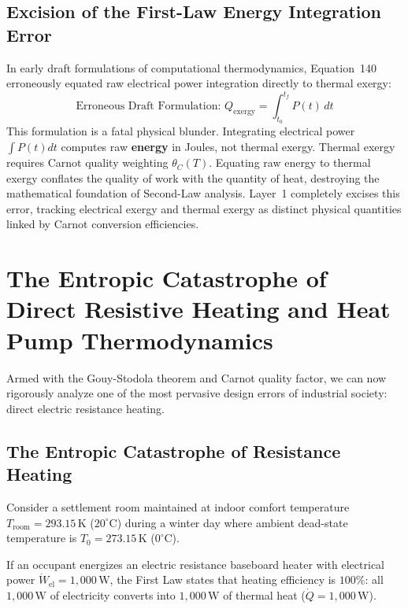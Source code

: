 \subsection{Excision of the First-Law Energy Integration Error}
In early draft formulations of computational thermodynamics, Equation~140 erroneously equated raw electrical power integration directly to thermal exergy:
\begin{equation}
\text{Erroneous Draft Formulation: } Q_{\mathrm{exergy}} = \int_{t_0}^{t_f} P(t) \, dt
\label{eq:erroneous_draft_eq}
\end{equation}
This formulation is a fatal physical blunder. Integrating electrical power $\int P(t) dt$ computes raw \textbf{energy} in Joules, not thermal exergy. Thermal exergy requires Carnot quality weighting $\theta_C(T)$. Equating raw energy to thermal exergy conflates the quality of work with the quantity of heat, destroying the mathematical foundation of Second-Law analysis. Layer~1 completely excises this error, tracking electrical exergy and thermal exergy as distinct physical quantities linked by Carnot conversion efficiencies.

\section{The Entropic Catastrophe of Direct Resistive Heating and Heat Pump Thermodynamics}
\label{sec:th_resistive_heatpump}

Armed with the Gouy-Stodola theorem and Carnot quality factor, we can now rigorously analyze one of the most pervasive design errors of industrial society: direct electric resistance heating.

\subsection{The Entropic Catastrophe of Resistance Heating}
Consider a settlement room maintained at indoor comfort temperature $T_{\mathrm{room}} = 293.15\,\mathrm{K}$ ($20^\circ\mathrm{C}$) during a winter day where ambient dead-state temperature is $T_0 = 273.15\,\mathrm{K}$ ($0^\circ\mathrm{C}$). 

If an occupant energizes an electric resistance baseboard heater with electrical power $\dot{W}_{\mathrm{el}} = 1,000\,\mathrm{W}$, the First Law states that heating efficiency is $100\%$: all $1,000\,\mathrm{W}$ of electricity converts into $1,000\,\mathrm{W}$ of thermal heat ($\dot{Q} = 1,000\,\mathrm{W}$).

